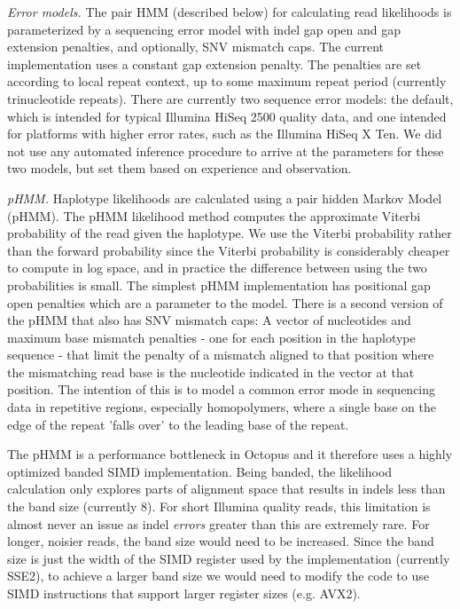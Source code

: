 \documentclass[notitlepage, twocolumn, 10pt]{article}
\begin{document}
\vspace{3mm}
\noindent\emph{Error models.} The pair HMM (described below) for calculating
read likelihoods is parameterized by a sequencing error model with indel gap open and gap extension penalties, and optionally, SNV mismatch caps. The current implementation uses a constant gap extension penalty. The penalties are set according to local repeat context, up to some maximum repeat period (currently trinucleotide repeats). There are currently two sequence error models: the default, which is intended for typical Illumina HiSeq 2500 quality data, and one intended for platforms with higher error rates, such as the Illumina HiSeq X Ten. We did not use any automated inference procedure to arrive at the parameters for these two models, but set them based on experience and observation.

\vspace{3mm}
\noindent\emph{pHMM.} Haplotype likelihoods are calculated using a pair hidden Markov Model (pHMM). The pHMM likelihood method computes the approximate Viterbi probability of the read given the haplotype. We use the Viterbi probability rather than the forward probability since the Viterbi probability is considerably cheaper to compute in log space, and in practice the difference between using the two probabilities is small. The simplest pHMM implementation has positional gap open penalties which are a parameter to the model. There is a second version of the pHMM that also has SNV mismatch caps: A vector of nucleotides and maximum base mismatch penalties - one for each position in the haplotype sequence - that limit the penalty of a mismatch aligned to that position where the mismatching read base is the nucleotide indicated in the vector at that position. The intention of this is to model a common error mode in sequencing data in repetitive regions, especially homopolymers, where a single base on the edge of the repeat 'falls over' to the leading base of the repeat.

The pHMM is a performance bottleneck in Octopus and it therefore uses a highly optimized banded SIMD implementation. Being banded, the likelihood calculation only explores parts of alignment space that results in indels less than the band size (currently 8). For short Illumina quality reads, this limitation is almost never an issue as indel \emph{errors} greater than this are extremely rare. For longer, noisier reads, the band size would need to be increased. Since the band size is just the width of the SIMD register used by the implementation (currently SSE2), to achieve a larger band size we would need to modify the code to use SIMD instructions that support larger register sizes (e.g. AVX2).
\end{document}
